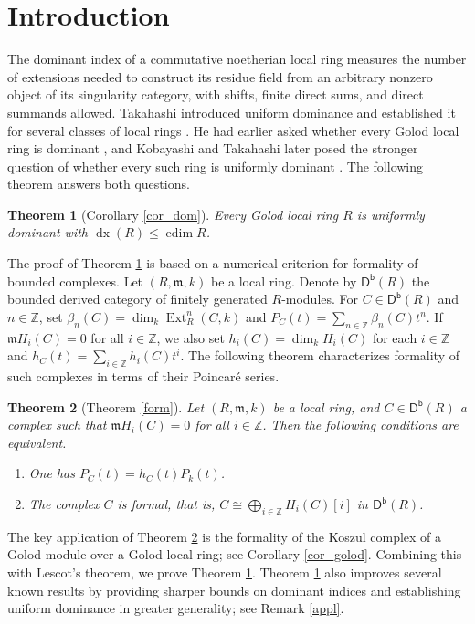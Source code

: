 \documentclass[10pt]{amsart}
\newtheorem{thm}{Theorem}[section]
\theoremstyle{definition}
\theoremstyle{remark}
\numberwithin{equation}{thm}
\def\db{\operatorname{\mathsf{D^b}}}
\def\dim{\operatorname{dim}}
\def\edim{\operatorname{edim}}
\def\Ext{\operatorname{Ext}}
\def\le{\leqslant}
\def\m{\mathfrak{m}}
\def\ZZ{\mathbb{Z}}
\begin{document}
\section{Introduction}
The dominant index of a commutative noetherian local ring measures the number of extensions needed to construct its residue field from an arbitrary nonzero object of its singularity category, with shifts, finite direct sums, and direct summands allowed. 
Takahashi introduced uniform dominance and established it for several classes of local rings \cite{T2026}.
He had earlier asked whether every Golod local ring is dominant \cite[Question 9.4]{T2023}, and Kobayashi and Takahashi later posed the stronger question of whether every such ring is uniformly dominant \cite[Question 1.1(3)]{KT2026}.
The following theorem answers both questions.
\begin{thm}[Corollary \ref{cor_dom}]\label{mthm_int1}
Every Golod local ring $R$ is uniformly dominant with $\operatorname{dx}(R)\le\edim R$. 
\end{thm}
The proof of Theorem \ref{mthm_int1} is based on a numerical criterion for formality of bounded complexes. 
Let $(R,\m,k)$ be a local ring.
Denote by $\db(R)$ the bounded derived category of finitely generated $R$-modules.
For $C\in\db(R)$ and $n\in\ZZ$, set $\beta_n(C)=\dim_k\Ext_R^n(C,k)$ and $P_C(t)=\sum_{n\in\ZZ}\beta_n(C)t^n$. 
If $\m H_i(C)=0$ for all $i\in\ZZ$, we also set $h_i(C)=\dim_k H_i(C)$ for each $i\in\ZZ$ and $h_C(t)=\sum_{i\in\ZZ}h_i(C)t^i$.
The following theorem characterizes formality of such complexes in terms of their Poincar\'e series.
\begin{thm}[Theorem \ref{form}]\label{mthm_int2}
Let $(R,\m,k)$ be a local ring, and $C\in\db(R)$ a complex such that $\m H_i(C)=0$ for all $i\in\mathbb Z$. 
Then the following conditions are equivalent.
\begin{enumerate}[\rm(1)]
\item 
One has $P_C(t)=h_C(t)P_k(t)$.
\item 
The complex $C$ is formal, that is, $C\cong\bigoplus_{i\in\mathbb Z}H_i(C)[i]$ in $\db(R)$.
\end{enumerate}
\end{thm}
The key application of Theorem \ref{mthm_int2} is the formality of the Koszul complex of a Golod module over a Golod local ring; see Corollary \ref{cor_golod}. 
Combining this with Lescot's theorem, we prove Theorem \ref{mthm_int1}.
Theorem \ref{mthm_int1} also improves several known results by providing sharper bounds on dominant indices and establishing uniform dominance in greater generality; see Remark \ref{appl}.
\end{document}
